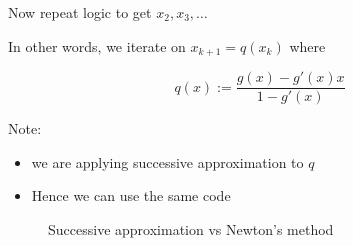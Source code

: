 \begin{frame}

    Now repeat logic to get $x_2, x_3, \ldots $
    \vspace{0.3em}
    \vspace{0.3em}

    In other words, we iterate on $x_{k+1} = q(x_k)$ where
    
    \begin{equation*}
        q(x) := \frac{g(x) - g'(x) x}{1 - g'(x)}
    \end{equation*}

    \vspace{0.3em}
    \vspace{0.3em}
    \vspace{0.3em}
    \vspace{0.3em}
    Note:
    \begin{itemize}
        \item we are applying successive approximation to $q$
        \vspace{0.3em}
        \vspace{0.3em}
        \item Hence we can use the same code
    \end{itemize}



\end{frame}


\begin{frame}
    
    \begin{figure}
       \centering
       \caption{\label{f:newton_solow_45} Successive approximation vs Newton's method}
    \end{figure}

\end{frame}

